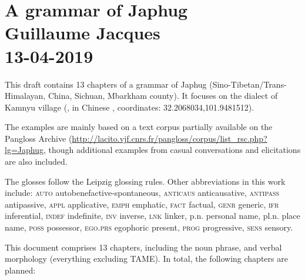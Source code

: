 \chapter*{A grammar of Japhug\\
Guillaume Jacques\\
13-04-2019}  
\sloppy
This draft contains 13 chapters of a grammar of Japhug (Sino-Tibetan/Trans-Himalayan, China, Sichuan, Mbarkham county). It focuses on the dialect of Kamnyu village (, in Chinese , coordinates: 32.2068034,101.9481512).

The examples are mainly based on a text corpus partially available on the Pangloss Archive (\url{http://lacito.vjf.cnrs.fr/pangloss/corpus/list\_rsc.php?lg=Japhug}, though additional examples from casual conversations and elicitations are also included.

The glosses follow the Leipzig glossing rules. Other abbreviations in this work include: \textsc{auto}  autobenefactive-spontaneous, \textsc{anticaus} anticausative, \textsc{antipass} antipassive, \textsc{appl} applicative, \textsc{emph} emphatic, \textsc{fact} factual, \textsc{genr} generic, \textsc{ifr} inferential, \textsc{indef} indefinite, \textsc{inv} inverse,  \textsc{lnk} linker, p.n. personal name, pl.n. place name, \textsc{poss} possessor, \textsc{ego.prs} egophoric present, \textsc{prog} progressive, \textsc{sens} sensory. 

This document comprises 13 chapters, including the noun phrase, and verbal morphology (everything excluding TAME). In total, the following chapters are planned:

